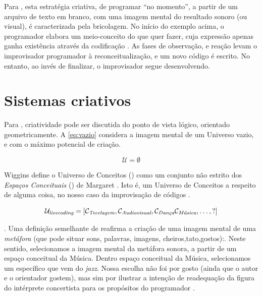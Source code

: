 Para , esta estratégia criativa, de programar ``no momento'', a partir de um arquivo de texto em branco, com uma imagem mental do resultado sonoro (ou visual), é caracterizada pela  bricolagem. No início do exemplo acima, o programador elabora um meio-conceito do que quer fazer, cuja expressão apenas ganha existência através da codificação . As fases de observação, e reação levam o improvisador programador à reconceitualização, e um novo código é escrito. No entanto, ao invés de finalizar, o improvisador segue desenvolvendo.

\section{Sistemas criativos}\label{sec:sistemas}

Para  , criatividade pode ser discutida do ponto de vista lógico, orientado geometricamente. A \autoref{eq:vazio} considera a imagem mental de um Universo vazio, e com o máximo potencial de criação. 

\begin{equation}
\mathcal{U} = \emptyset
\end{equation}\label{eq:vazio}

 Wiggins define o Universo de Conceitos () como um conjunto não estrito dos \emph{Espaços Conceituais} () de Margaret . Isto é, um Universo de Conceitos a respeito de alguma coisa, no nosso caso da improvisação de códigos . 

\begin{equation}
\mathcal{U}_\emph{livecoding} = [\mathcal{C}_\emph{Tecelagem}, \mathcal{C}_\emph{Audiovisual}, \mathcal{C}_\emph{Dança} \mathcal{C}_\emph{Música}, \ldots, ?]
\end{equation}\label{eq:ul}

. Uma definição semelhante de  reafirma a criação de uma imagem mental de uma \emph{metáfora} (que pode situar sons, palavras, imagens, cheiros,tato,gostos):. Neste sentido, selecionamos a imagem mental da metáfora sonora, a partir de um espaço conceitual da Música. Dentro espaço conceitual da Música, selecionamos um específico que vem do \emph{jazz}. Nossa escolha não foi por gosto (ainda que o autor e o orientador gostem), mas sim por ilustrar a intenção de readequação da figura do intérprete concertista para os propósitos do programador .  


